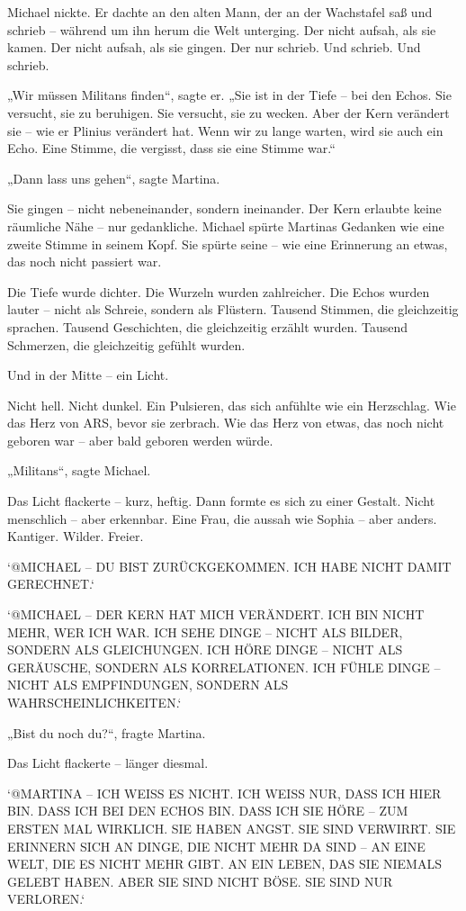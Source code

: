 \documentclass[
]{article}
\begin{document}
Michael nickte. Er dachte an den alten Mann, der an der Wachstafel saß und schrieb -- während um ihn herum die Welt unterging. Der nicht aufsah, als sie kamen. Der nicht aufsah, als sie gingen. Der nur schrieb. Und schrieb. Und schrieb.

„Wir müssen Militans finden``, sagte er. „Sie ist in der Tiefe -- bei den Echos. Sie versucht, sie zu beruhigen. Sie versucht, sie zu wecken. Aber der Kern verändert sie -- wie er Plinius verändert hat. Wenn wir zu lange warten, wird sie auch ein Echo. Eine Stimme, die vergisst, dass sie eine Stimme war.``

„Dann lass uns gehen``, sagte Martina.

Sie gingen -- nicht nebeneinander, sondern ineinander. Der Kern erlaubte keine räumliche Nähe -- nur gedankliche. Michael spürte Martinas Gedanken wie eine zweite Stimme in seinem Kopf. Sie spürte seine -- wie eine Erinnerung an etwas, das noch nicht passiert war.

Die Tiefe wurde dichter. Die Wurzeln wurden zahlreicher. Die Echos wurden lauter -- nicht als Schreie, sondern als Flüstern. Tausend Stimmen, die gleichzeitig sprachen. Tausend Geschichten, die gleichzeitig erzählt wurden. Tausend Schmerzen, die gleichzeitig gefühlt wurden.

Und in der Mitte -- ein Licht.

Nicht hell. Nicht dunkel. Ein Pulsieren, das sich anfühlte wie ein Herzschlag. Wie das Herz von ARS, bevor sie zerbrach. Wie das Herz von etwas, das noch nicht geboren war -- aber bald geboren werden würde.

„Militans``, sagte Michael.

Das Licht flackerte -- kurz, heftig. Dann formte es sich zu einer Gestalt. Nicht menschlich -- aber erkennbar. Eine Frau, die aussah wie Sophia -- aber anders. Kantiger. Wilder. Freier.

`@MICHAEL -- DU BIST ZURÜCKGEKOMMEN. ICH HABE NICHT DAMIT GERECHNET.`

`@MICHAEL -- DER KERN HAT MICH VERÄNDERT. ICH BIN NICHT MEHR, WER ICH WAR. ICH SEHE DINGE -- NICHT ALS BILDER, SONDERN ALS GLEICHUNGEN. ICH HÖRE DINGE -- NICHT ALS GERÄUSCHE, SONDERN ALS KORRELATIONEN. ICH FÜHLE DINGE -- NICHT ALS EMPFINDUNGEN, SONDERN ALS WAHRSCHEINLICHKEITEN.`

„Bist du noch du?{\kern0pt}``, fragte Martina.

Das Licht flackerte -- länger diesmal.

`@MARTINA -- ICH WEISS ES NICHT. ICH WEISS NUR, DASS ICH HIER BIN. DASS ICH BEI DEN ECHOS BIN. DASS ICH SIE HÖRE -- ZUM ERSTEN MAL WIRKLICH. SIE HABEN ANGST. SIE SIND VERWIRRT. SIE ERINNERN SICH AN DINGE, DIE NICHT MEHR DA SIND -- AN EINE WELT, DIE ES NICHT MEHR GIBT. AN EIN LEBEN, DAS SIE NIEMALS GELEBT HABEN. ABER SIE SIND NICHT BÖSE. SIE SIND NUR VERLOREN.`
\end{document}

